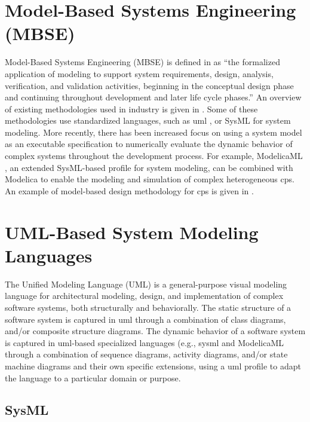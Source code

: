 \section{Model-Based Systems Engineering (MBSE)}
\label{sec:mbse}

Model-Based Systems Engineering (MBSE) is defined in \cite{mbsdincose} as “the formalized application of modeling to support system requirements, design, analysis, verification, and validation activities, beginning in the conceptual design phase and continuing throughout development and later life cycle phases.” An overview of existing methodologies used in industry is given in \cite{mbsdestefan}. Some of these methodologies use standardized languages, such as \acrshort{uml} \cite{uml}, or SysML \cite{sysml} for system modeling. 
More recently, there has been increased focus on using a system model as an executable specification to numerically evaluate the dynamic behavior of complex systems throughout the development process. For example, ModelicaML \cite{modelicaml, modelicamlreport}, an extended SysML-based profile for system modeling, can be combined with Modelica to enable the modeling and simulation of complex heterogeneous \acrshort{cps}. An example of model-based design methodology for \acrshort{cps} is given in \cite{mbsdjensen}.


\section{UML-Based System Modeling Languages}
\label{sec:uml}
 
The Unified Modeling Language (UML) \cite{uml} is a general-purpose visual modeling language for architectural modeling, design, and implementation of complex software systems, both structurally and behaviorally. The static structure of a software system is captured in \acrshort{uml} through a combination of class diagrams, and/or composite structure diagrams. The dynamic behavior of a software system is captured in \acrshort{uml}-based specialized languages (e.g., \acrshort{sysml} \cite{sysml,sysmlmorgan} and ModelicaML \cite{modelicaml, modelicamlreport} through a combination of sequence diagrams, activity diagrams, and/or state machine diagrams and their own specific extensions, using a \acrshort{uml} profile to adapt the language to a particular domain or purpose. 

\subsection{SysML}
\label{sec:sysml}



